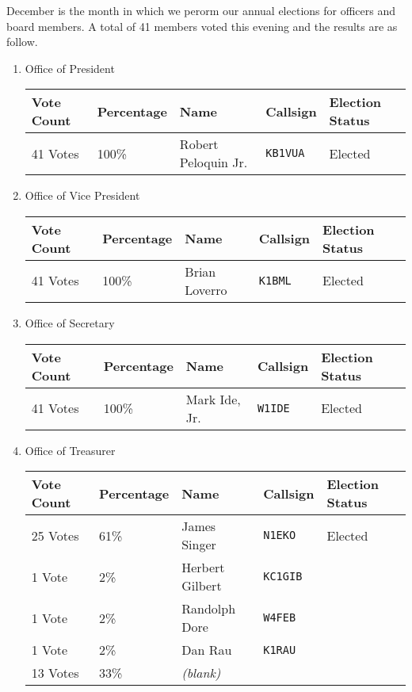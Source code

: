 \documentclass[10pt,letterpaper]{article}
\begin{document}
December is the month in which we perorm our annual elections for officers and board members. A total of 41 members voted this evening and the results are as follow.
\begin{enumerate}
\item Office of President\\
\begin{tabular}{|l|l|l|l|l|}
\hline
\textbf{Vote Count} & \textbf{Percentage} & \textbf{Name} & \textbf{Callsign} & \textbf{Election Status} \\
\hline
41 Votes & 100\% & Robert Peloquin Jr. & \texttt{KB1VUA} & Elected \\
\hline
\end{tabular}
\item Office of Vice President\\
\begin{tabular}{|l|l|l|l|l|}
\hline
\textbf{Vote Count} & \textbf{Percentage} & \textbf{Name} & \textbf{Callsign} & \textbf{Election Status} \\
\hline
41 Votes & 100\% & Brian Loverro & \texttt{K1BML} & Elected \\
\hline
\end{tabular}
\item Office of Secretary\\
\begin{tabular}{|l|l|l|l|l|}
\hline
\textbf{Vote Count} & \textbf{Percentage} & \textbf{Name} & \textbf{Callsign} & \textbf{Election Status} \\
\hline
41 Votes & 100\% & Mark Ide, Jr. & \texttt{W1IDE} & Elected \\
\hline
\end{tabular}
\item Office of Treasurer\\
\begin{tabular}{|l|l|l|l|l|}
\hline
\textbf{Vote Count} & \textbf{Percentage} & \textbf{Name} & \textbf{Callsign} & \textbf{Election Status} \\
\hline
25 Votes & 61\% & James Singer & \texttt{N1EKO} & Elected \\
1 Vote & 2\% & Herbert Gilbert & \texttt{KC1GIB} & \\
1 Vote & 2\% & Randolph Dore & \texttt{W4FEB} & \\
1 Vote & 2\% & Dan Rau & \texttt{K1RAU} & \\
\hline
13 Votes & 33\% & \emph{(blank)} & &  \\
\hline
\end{tabular}

\end{enumerate}
\end{document}
